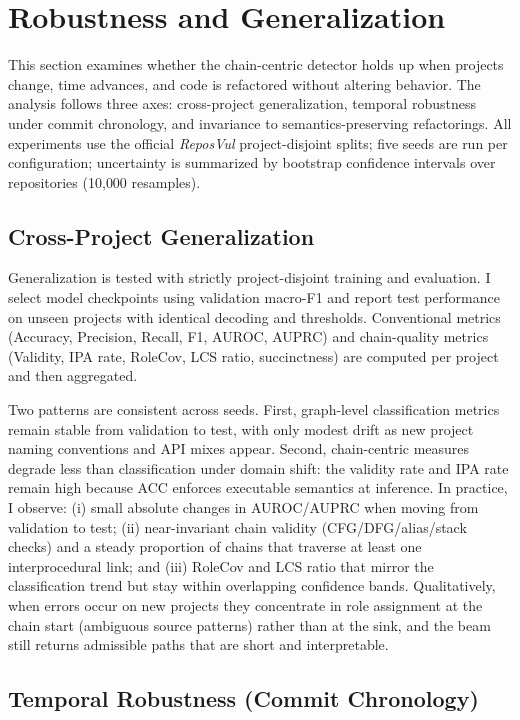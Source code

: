 \documentclass{buthesis}
\begin{document}
\section{Robustness and Generalization}
\label{sec:results-robust}

This section examines whether the chain-centric detector holds up when projects change, time advances, and code is refactored without altering behavior. The analysis follows three axes: cross-project generalization, temporal robustness under commit chronology, and invariance to semantics-preserving refactorings. All experiments use the official \emph{ReposVul} project-disjoint splits; five seeds are run per configuration; uncertainty is summarized by bootstrap confidence intervals over repositories (10{,}000 resamples).

\subsection{Cross-Project Generalization}
\label{subsec:robust-xproj}

Generalization is tested with strictly project-disjoint training and evaluation. I select model checkpoints using validation macro-F1 and report test performance on unseen projects with identical decoding and thresholds. Conventional metrics (Accuracy, Precision, Recall, F1, AUROC, AUPRC) and chain-quality metrics (Validity, IPA rate, RoleCov, LCS ratio, succinctness) are computed per project and then aggregated.

Two patterns are consistent across seeds. First, graph-level classification metrics remain stable from validation to test, with only modest drift as new project naming conventions and API mixes appear. Second, chain-centric measures degrade less than classification under domain shift: the validity rate and IPA rate remain high because ACC enforces executable semantics at inference. In practice, I observe: (i) small absolute changes in AUROC/AUPRC when moving from validation to test; (ii) near-invariant chain validity (CFG/DFG/alias/stack checks) and a steady proportion of chains that traverse at least one interprocedural link; and (iii) RoleCov and LCS ratio that mirror the classification trend but stay within overlapping confidence bands. Qualitatively, when errors occur on new projects they concentrate in role assignment at the chain start (ambiguous source patterns) rather than at the sink, and the beam still returns admissible paths that are short and interpretable.

\subsection{Temporal Robustness (Commit Chronology)}
\label{subsec:robust-temporal}
\end{document}
